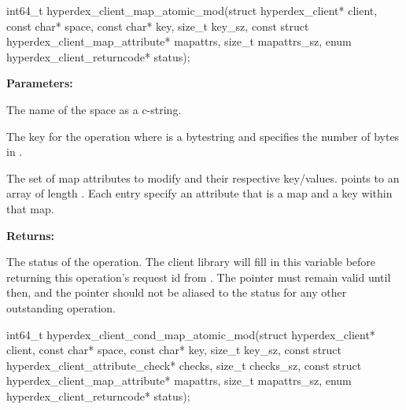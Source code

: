 \funcsep
{}
\begin{ccode}
int64_t hyperdex_client_map_atomic_mod(struct hyperdex_client* client,
                const char* space,
                const char* key, size_t key_sz,
                const struct hyperdex_client_map_attribute* mapattrs, size_t mapattrs_sz,
                enum hyperdex_client_returncode* status);
\end{ccode}
\funcdesc 

\noindent\textbf{Parameters:}
\begin{description}[labelindent=\widthof{{\code{mapattrs}, \code{mapattrs\_sz}}},leftmargin=*,noitemsep,nolistsep,align=right]
\item[\code{space}] The name of the space as a c-string.
\item[\code{key}, \code{key\_sz}] The key for the operation where  is a bytestring and  specifies the number of bytes in .
\item[\code{mapattrs}, \code{mapattrs\_sz}] The set of map attributes to modify and their respective key/values.   points to an array of length .  Each entry specify an attribute that is a map and a key within that map.
\end{description}

\noindent\textbf{Returns:}
\begin{description}[labelindent=\widthof{{\code{status}}},leftmargin=*,noitemsep,nolistsep,align=right]
\item[\code{status}] The status of the operation.  The client library will fill in this variable before returning this operation's request id from .  The pointer must remain valid until then, and the pointer should not be aliased to the status for any other outstanding operation.
\end{description}

\funcsep
{}
\begin{ccode}
int64_t hyperdex_client_cond_map_atomic_mod(struct hyperdex_client* client,
                const char* space,
                const char* key, size_t key_sz,
                const struct hyperdex_client_attribute_check* checks, size_t checks_sz,
                const struct hyperdex_client_map_attribute* mapattrs, size_t mapattrs_sz,
                enum hyperdex_client_returncode* status);
\end{ccode}
\funcdesc 


